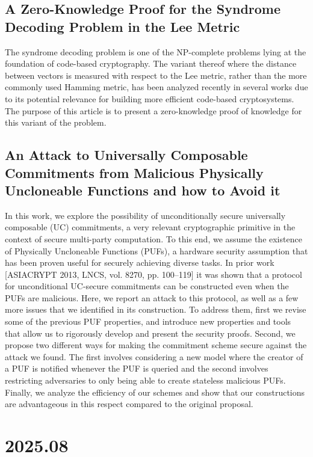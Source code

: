 \documentclass[11pt,oneside]{book}
\theoremstyle{definition}
\theoremstyle{remark}
\theoremstyle{plain}
\begin{document}
\section{\cite{cryptoeprint:2025/1373} A Zero-Knowledge Proof for the Syndrome Decoding Problem in the Lee Metric}
The syndrome decoding problem is one of the NP-complete problems lying at the foundation of code-based cryptography. The variant thereof where the distance between vectors is measured with respect to the Lee metric, rather than the more commonly used Hamming metric, has been analyzed recently in several works due to its potential relevance for building more efficient code-based cryptosystems. The purpose of this article is to present a zero-knowledge proof of knowledge for this variant of the problem.

\section{\cite{cryptoeprint:2025/1374} An Attack to Universally Composable Commitments from Malicious Physically Uncloneable Functions and how to Avoid it}
In this work, we explore the possibility of unconditionally secure universally composable (UC) commitments, a very relevant cryptographic primitive in the context of secure multi-party computation. To this end, we assume the existence of Physically Uncloneable Functions (PUFs), a hardware security assumption
that has been proven useful for securely achieving diverse tasks. In prior work [ASIACRYPT 2013, LNCS, vol. 8270, pp. 100–119] it was shown that a protocol for unconditional UC-secure commitments can be constructed even when the PUFs are malicious. Here, we report an attack to this protocol, as well as a few more issues that we identified in its construction. To address them, first we revise some of the previous PUF properties, and introduce new properties and tools that allow us to rigorously develop and present the security proofs. Second, we propose two different ways for making the commitment scheme secure against the attack we found. The first involves considering a new model where the creator of a PUF is notified whenever the PUF is queried
and the second involves restricting adversaries to only being able to create stateless malicious PUFs. Finally, we analyze the efficiency of our schemes and show that our constructions are advantageous in this respect compared to the original proposal.


\chapter{2025.08}
\end{document}
